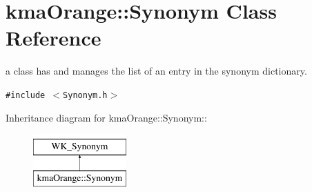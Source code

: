 \hypertarget{classkmaOrange_1_1Synonym}{
\section{kmaOrange::Synonym Class Reference}
\label{classkmaOrange_1_1Synonym}
}
a class has and manages the list of an entry in the synonym dictionary.  


{\tt \#include $<$Synonym.h$>$}

Inheritance diagram for kmaOrange::Synonym::\begin{figure}[H]
\begin{center}
\leavevmode
\includegraphics[height=2cm]{classkmaOrange_1_1Synonym}
\end{center}
\end{figure}
